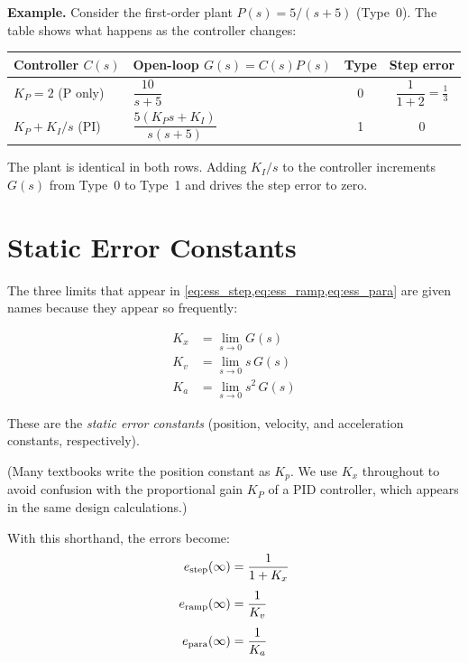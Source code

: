 \documentclass[12pt]{article}
\begin{document}
\textbf{Example.}  Consider the first-order plant $P(s) = 5/(s+5)$ (Type~0).
The table shows what happens as the controller changes:

\begin{center}
\begin{tabular}{llcc}
\toprule
Controller $C(s)$ & Open-loop $G(s) = C(s)P(s)$ & Type & Step error \\
\midrule
$K_P = 2$ (P only) & $\dfrac{10}{s+5}$                 & 0 & $\dfrac{1}{1+2} = \tfrac{1}{3}$ \\[9pt]
$K_P + K_I/s$ (PI) & $\dfrac{5(K_P s + K_I)}{s(s+5)}$ & 1 & $0$ \\[9pt]
\bottomrule
\end{tabular}
\end{center}

The plant is identical in both rows.  Adding $K_I/s$ to the controller increments
$G(s)$ from Type~0 to Type~1 and drives the step error to zero.

\section{Static Error Constants}
\label{sec:error_constants}

The three limits that appear in \cref{eq:ess_step,eq:ess_ramp,eq:ess_para} are
given names because they appear so frequently:

\begin{align}
  K_x &= \lim_{s \to 0} G(s)         \label{eq:Kx} \\[4pt]
  K_v &= \lim_{s \to 0} s\,G(s)      \label{eq:Kv} \\[4pt]
  K_a &= \lim_{s \to 0} s^2\,G(s)    \label{eq:Ka}
\end{align}

These are the \emph{static error constants} (position, velocity, and
acceleration constants, respectively).

(Many textbooks write the position constant as $K_p$.  We
use $K_x$ throughout to avoid confusion with the proportional gain $K_P$
of a PID controller, which appears in the same design calculations.)

With this shorthand, the errors become:
\begin{align}
  e_{\rm step}(\infty) &= \frac{1}{1 + K_x} \label{eq:ess_Kx} \\[4pt]
  e_{\rm ramp}(\infty) &= \frac{1}{K_v}     \label{eq:ess_Kv} \\[4pt]
  e_{\rm para}(\infty) &= \frac{1}{K_a}     \label{eq:ess_Ka}
\end{align}
\end{document}
